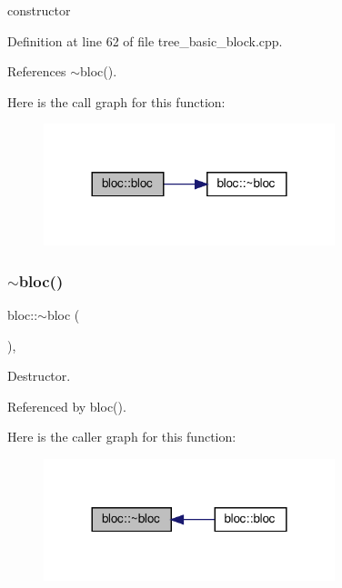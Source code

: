 constructor 



Definition at line 62 of file tree\+\_\+basic\+\_\+block.\+cpp.



References $\sim$bloc().

Here is the call graph for this function\+:
\nopagebreak
\begin{figure}[H]
\begin{center}
\leavevmode
\includegraphics[width=240pt]{d6/df6/structbloc_af2b131aef8fd51742dc6f4c34b303a88_cgraph}
\end{center}
\end{figure}
\mbox{\label{structbloc_a68257893dd884fac2e0fb0b279262566}} 
\subsubsection{\texorpdfstring{$\sim$bloc()}{~bloc()}}
{\footnotesize\ttfamily bloc\+::$\sim$bloc (\begin{DoxyParamCaption}{ }\end{DoxyParamCaption})\hspace{0.3cm}{\ttfamily [virtual]}, {\ttfamily [default]}}



Destructor. 



Referenced by bloc().

Here is the caller graph for this function\+:
\nopagebreak
\begin{figure}[H]
\begin{center}
\leavevmode
\includegraphics[width=240pt]{d6/df6/structbloc_a68257893dd884fac2e0fb0b279262566_icgraph}
\end{center}
\end{figure}



